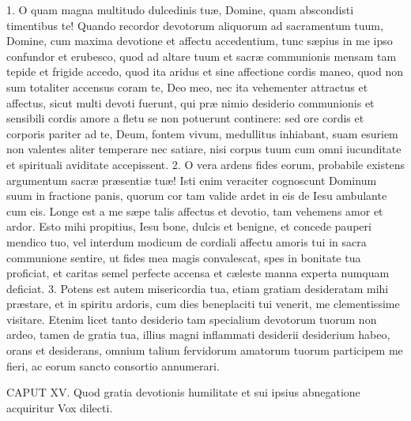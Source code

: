 1. O quam magna multitudo dulcedinis tuæ, Domine, quam abscondisti timentibus te! Quando recordor devotorum aliquorum ad sacramentum tuum, Domine, cum maxima devotione et affectu accedentium, tunc sæpius in me ipso confundor et erubesco, quod ad altare tuum et sacræ communionis mensam tam tepide et frigide accedo, quod ita aridus et sine affectione cordis maneo, quod non sum totaliter accensus coram te, Deo meo, nec ita vehementer attractus et affectus, sicut multi devoti fuerunt, qui præ nimio desiderio communionis et sensibili cordis amore a fletu se non potuerunt continere: sed ore cordis et corporis pariter ad te, Deum, fontem vivum, medullitus inhiabant, suam esuriem non valentes aliter temperare nec satiare, nisi corpus tuum cum omni iucunditate et spirituali aviditate accepissent.
2. O vera ardens fides eorum, probabile existens argumentum sacræ præsentiæ tuæ! Isti enim veraciter cognoscunt Dominum suum in fractione panis, quorum cor tam valide ardet in eis de Iesu ambulante cum eis. Longe est a me sæpe talis affectus et devotio, tam vehemens amor et ardor. Esto mihi propitius, Iesu bone, dulcis et benigne, et concede pauperi mendico tuo, vel interdum modicum de cordiali affectu amoris tui in sacra communione sentire, ut fides mea magis convalescat, spes in bonitate tua proficiat, et caritas semel perfecte accensa et cæleste manna experta numquam deficiat.
3. Potens est autem misericordia tua, etiam gratiam desideratam mihi præstare, et in spiritu ardoris, cum dies beneplaciti tui venerit, me clementissime visitare. Etenim licet tanto desiderio tam specialium devotorum tuorum non ardeo, tamen de gratia tua, illius magni inflammati desiderii desiderium habeo, orans et desiderans, omnium talium fervidorum amatorum tuorum participem me fieri, ac eorum sancto consortio annumerari.


CAPUT XV.
Quod gratia devotionis humilitate et sui ipsius abnegatione acquiritur
Vox dilecti.

